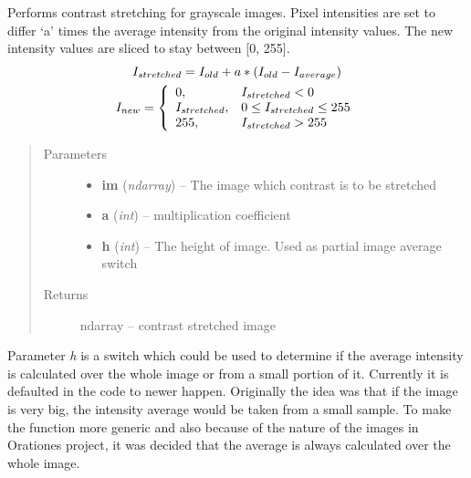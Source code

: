 \documentclass[letterpaper,10pt,english]{sphinxmanual}
\begin{document}
\begin{fulllineitems}
\begin{fulllineitems}
\label{code:OratUtils.OratUtils.contStretch}
Performs contrast stretching for grayscale images. Pixel intensities are set to 
differ `a' times the average intensity from the original intensity values. The new 
intensity values are sliced to stay between {[}0, 255{]}.
\begin{gather}
\begin{split}I_{stretched} = I_{old} + a*( I_{old} - I_{average} )\end{split}\notag\\\begin{split}I_{new} =
\left\{
\begin{array}[l]{ll}
  0, & I_{stretched} < 0 \\
  I_{stretched}, & 0 \leq I_{stretched} \leq 255\\
  255, & I_{stretched} > 255
\end{array}
\right.\end{split}\notag
\end{gather}\begin{quote}\begin{description}
\item[{Parameters}] \leavevmode\begin{itemize}
\item {} 
\textbf{im} (\emph{ndarray}) -- The image which contrast is to be stretched

\item {} 
\textbf{a} (\emph{int}) -- multiplication coefficient

\item {} 
\textbf{h} (\emph{int}) -- The height of image. Used as partial image average switch

\end{itemize}

\item[{Returns}] \leavevmode
ndarray -- contrast stretched image

\end{description}\end{quote}

Parameter \emph{h} is a switch which could be used to determine if the average intensity 
is calculated over the whole image or from a small portion of it. Currently it is 
defaulted in the code to newer happen. Originally the idea was that if the image 
is very big, the intensity average would be taken from a small sample. To make the 
function more generic and also because of the nature of the images in Orationes 
project, it was decided that the average is always calculated over the whole image.


\end{fulllineitems}
\end{fulllineitems}
\end{document}
